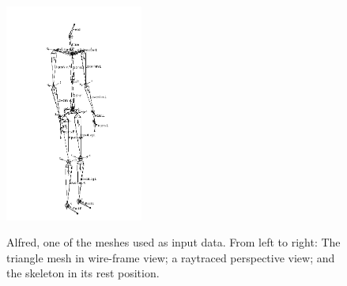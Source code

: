 \begin{figure}
{    \includegraphics[width=45.16mm,height=71.6mm]{figures/alfred-skeleton}}
\caption{Alfred, one of the meshes used as input data. From left to right: The triangle mesh in
    wire-frame view; a raytraced perspective view; and the skeleton in its rest position.
    \label{alfredFigure}}
\end{figure}
